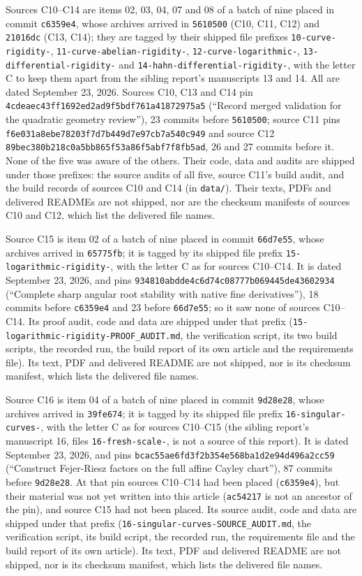 \documentclass[11pt,oneside]{article}
\numberwithin{equation}{section}
\theoremstyle{definition}
\theoremstyle{remark}
\newcommand{\fn}[1]{\nolinkurl{#1}}
\begin{document}
Sources C10--C14 are items 02, 03, 04, 07 and 08 of a batch of nine placed in
commit \texttt{c6359e4}, whose archives arrived in \texttt{5610500} (C10, C11, C12)
and \texttt{21016dc} (C13, C14); they are tagged by their shipped file prefixes
\fn{10-curve-rigidity-}, \fn{11-curve-abelian-rigidity-},
\fn{12-curve-logarithmic-}, \fn{13-differential-rigidity-} and
\fn{14-hahn-differential-rigidity-}, with the letter C to keep them apart from the
sibling report's manuscripts 13 and 14. All are dated September 23, 2026. Sources
C10, C13 and C14 pin \nolinkurl{4cdeaec43ff1692ed2ad9f5bdf761a41872975a5} (``Record
merged validation for the quadratic geometry review''), 23 commits before
\texttt{5610500}; source C11 pins \nolinkurl{f6e031a8ebe78203f7d7b449d7e97cb7a540c949}
and source C12 \nolinkurl{89bec380b218c0a5bb865f53a86f5abf7f8fb5ad}, 26 and 27
commits before it. None of the five was aware of the others. Their code, data and
audits are shipped under those prefixes: the source audits of all five, source C11's
build audit, and the build records of sources C10 and C14 (in \fn{data/}). Their
texts, PDFs and delivered READMEs are not shipped, nor are the checksum manifests of
sources C10 and C12, which list the delivered file names.

Source C15 is item 02 of a batch of nine placed in commit \texttt{66d7e55}, whose
archives arrived in \texttt{65775fb}; it is tagged by its shipped file prefix
\fn{15-logarithmic-rigidity-}, with the letter C as for sources C10--C14. It is dated
September 23, 2026, and pins \nolinkurl{934810abdde4c6d74c08777b069445de43602934}
(``Complete sharp angular root stability with native fine derivatives''), 18 commits
before \texttt{c6359e4} and 23 before \texttt{66d7e55}; so it saw none of sources
C10--C14. Its proof audit, code and data are shipped under that prefix
(\fn{15-logarithmic-rigidity-PROOF_AUDIT.md}, the verification script, its two build
scripts, the recorded run, the build report of its own article and the requirements
file). Its text, PDF and delivered README are not shipped, nor is its checksum manifest,
which lists the delivered file names.

Source C16 is item 04 of a batch of nine placed in commit \texttt{9d28e28}, whose archives
arrived in \texttt{39fe674}; it is tagged by its shipped file prefix
\fn{16-singular-curves-}, with the letter C as for sources C10--C15 (the sibling report's
manuscript 16, files \fn{16-fresh-scale-}, is not a source of this report). It is dated
September 23, 2026, and pins \nolinkurl{bcac55ae6fd3f2b354e568ba1d2e94d496a2cc59}
(``Construct Fejer-Riesz factors on the full affine Cayley chart''), 87 commits before
\texttt{9d28e28}. At that pin sources C10--C14 had been placed (\texttt{c6359e4}), but their
material was not yet written into this article (\texttt{ac54217} is not an ancestor of the
pin), and source C15 had not been placed. Its source audit, code and data are shipped under
that prefix (\fn{16-singular-curves-SOURCE_AUDIT.md}, the verification script, its build
script, the recorded run, the requirements file and the build report of its own article).
Its text, PDF and delivered README are not shipped, nor is its checksum manifest, which
lists the delivered file names.
\end{document}
